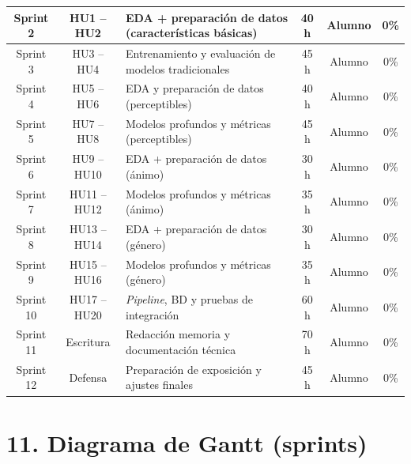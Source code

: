 \documentclass[
11pt, %
]{charter}
\begin{document}
\begin{table}[htpb]
\begin{tabularx}{\linewidth}{@{}|c|c|X|c|c|c|@{}}
Sprint 2 & HU1 – HU2 & EDA + preparación de datos (características básicas) & 40 h & Alumno & 0\% \\ \hline
Sprint 3 & HU3 – HU4 & Entrenamiento y evaluación de modelos tradicionales & 45 h & Alumno & 0\% \\ \hline
Sprint 4 & HU5 – HU6 & EDA y preparación de datos (perceptibles) & 40 h & Alumno & 0\% \\ \hline
Sprint 5 & HU7 – HU8 & Modelos profundos y métricas (perceptibles) & 45 h & Alumno & 0\% \\ \hline
Sprint 6 & HU9 – HU10 & EDA + preparación de datos (ánimo) & 30 h & Alumno & 0\% \\ \hline
Sprint 7 & HU11 – HU12 & Modelos profundos y métricas (ánimo) & 35 h & Alumno & 0\% \\ \hline
Sprint 8 & HU13 – HU14 & EDA + preparación de datos (género) & 30 h & Alumno & 0\% \\ \hline
Sprint 9 & HU15 – HU16 & Modelos profundos y métricas (género) & 35 h & Alumno & 0\% \\ \hline
Sprint 10 & HU17 – HU20 & \textit{Pipeline}, BD y pruebas de integración & 60 h & Alumno & 0\% \\ \hline
Sprint 11 & Escritura & Redacción memoria y documentación técnica & 70 h & Alumno & 0\% \\ \hline
Sprint 12 & Defensa & Preparación de exposición y ajustes finales & 45 h & Alumno & 0\% \\ \hline
\end{tabularx}
\end{table}

\newpage


\section{11. Diagrama de Gantt (sprints)}
\label{sec:gantt}

\end{document}
